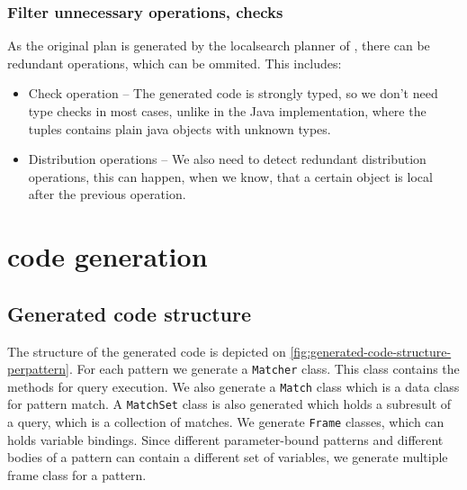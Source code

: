 

\subsubsection{Filter unnecessary operations, checks}
As the original plan is generated by the localsearch planner of \viatra{}, there can be redundant operations, which can be ommited. This includes:

\begin{itemize}
	\item Check operation -- The generated code is strongly typed, so we don't need type checks in most cases, unlike in the Java implementation, where the tuples contains plain java objects with unknown types.
	
	\item Distribution operations -- We also need to detect redundant distribution operations, this can happen, when we know, that a certain object is local after the previous operation.
\end{itemize}



\section{\protect\cpptt{} code generation}



\subsection{Generated code structure}

The structure of the generated code is depicted on \autoref{fig:generated-code-structure-perpattern}.
For each pattern we generate a \texttt{Matcher} class.
This class contains the methods for query execution.
We also generate a \texttt{Match} class which is a data class for pattern match.
A \texttt{MatchSet} class is also generated which holds a subresult of a query, which is a collection of matches.
We generate \texttt{Frame} classes, which can holds variable bindings. 
Since different parameter-bound patterns and different bodies of a pattern can contain a different set of variables, we generate multiple frame class for a pattern.


